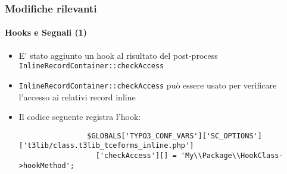 \begin{frame}[fragile]
	\frametitle{Modifiche rilevanti}
	\framesubtitle{Hooks e Segnali (1)}

	\lstset{basicstyle=\tiny\ttfamily}

	\begin{itemize}

		\item  E' stato aggiunto un hook al risultato del post-process \texttt{InlineRecordContainer::checkAccess}

		\item \texttt{InlineRecordContainer::checkAccess} può essere usato per verificare l'accesso ai relativi record inline

		\item Il codice seguente registra l'hook:

			\begin{lstlisting}
				$GLOBALS['TYPO3_CONF_VARS']['SC_OPTIONS']['t3lib/class.t3lib_tceforms_inline.php']
				  ['checkAccess'][] = 'My\\Package\\HookClass->hookMethod';
			\end{lstlisting}

	\end{itemize}

\end{frame}


